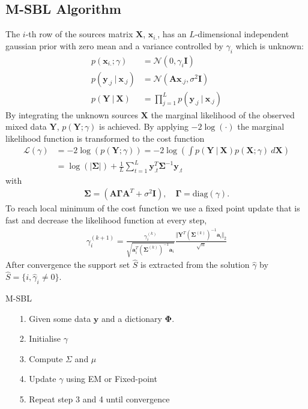 \subsection{M-SBL Algorithm}
The $i$-th row of the sources matrix $\mathbf{X}$, $\mathbf{x}_{i.}$, has an $L$-dimensional independent gaussian prior with zero mean and a variance controlled by $\gamma_i$ which is unknown:
\begin{align*}
p (\mathbf{x}_{i.} ; \gamma) &= \mathcal{N}(0, \gamma_i \mathbf{I}) \\
p (\mathbf{y}_{.j} \ \vert \ \mathbf{x}_{.j}) &= \mathcal{N}(\mathbf{Ax}_{.j}, \sigma^2 \mathbf{I}) \\
p (\mathbf{Y} \ \vert \ \mathbf{X}) &= \prod_{j=1}^L p (\mathbf{y}_{.j} \ \vert \ \mathbf{x}_{.j})
\end{align*}
By integrating the unknown sources $\mathbf{X}$ the marginal likelihood of the observed mixed data $\mathbf{Y}$, $p (\mathbf{Y} ; \gamma)$ is achieved. By applying $-2 \log (\cdot)$ the marginal likelihood function is transformed to the cost function
\begin{align*}
\mathcal{L}(\gamma) &= - 2 \log(p (\mathbf{Y} ; \gamma)) = -2 \log \left( \int p (\mathbf{Y} \ \vert \ \mathbf{X}) p (\mathbf{X} ; \gamma) \ d\mathbf{X} \right) \\
&= \log ( \vert \boldsymbol{\Sigma} \vert) + \frac{1}{L} \sum_{t=1}^L \mathbf{y}_{.t}^T \boldsymbol{\Sigma}^{-1} \mathbf{y}_{.t}
\end{align*}
with
\begin{align*}
\boldsymbol{\Sigma} = (\mathbf{A} \boldsymbol{\Gamma} \mathbf{A}^T + \sigma^2 \mathbf{I}), \quad \boldsymbol{\Gamma} = \text{diag}(\gamma).
\end{align*}
To reach local minimum of the cost function we use a fixed point update that is fast and decrease the likelihood function at every step,
\begin{align*}
\gamma_i^{(k+1)} = \frac{\gamma_i^{(k)}}{\sqrt{\mathbf{a}_i^T (\boldsymbol{\Sigma}^{(k)})^{-1} \mathbf{a}_i}} \frac{\Vert \mathbf{Y}^T (\boldsymbol{\Sigma}^{(k)})^{-1} \mathbf{a}_i \Vert_2}{\sqrt{n}}
\end{align*}
After convergence the support set $\hat{S}$ is extracted from the solution $\hat{\gamma}$ by $\hat{S} = \{ i, \hat{\gamma}_i \neq 0 \}$.


\begin{algorithm}[H]
\caption{M-SBL}
\begin{itemize}
\item[1.] Given some data $\mathbf{y}$ and a dictionary $\boldsymbol{\Phi}$.
\item[2.] Initialise $\gamma$
\item[3.] Compute $\Sigma$ and $\mu$
\item[4.] Update $\gamma$ using EM or Fixed-point
\item[5.] Repeat step 3 and 4 until convergence
\end{itemize}
\end{algorithm}

